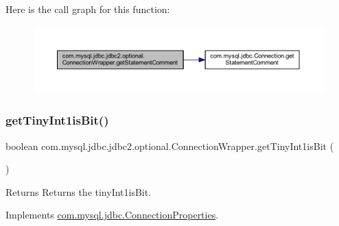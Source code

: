Here is the call graph for this function\+:
\nopagebreak
\begin{figure}[H]
\begin{center}
\leavevmode
\includegraphics[width=350pt]{classcom_1_1mysql_1_1jdbc_1_1jdbc2_1_1optional_1_1_connection_wrapper_a14a98d8f5aed8168fbb25a76210e9878_cgraph}
\end{center}
\end{figure}
\mbox{\label{classcom_1_1mysql_1_1jdbc_1_1jdbc2_1_1optional_1_1_connection_wrapper_a0c0c590343b7fce7d02e4293a92d4cb8}} 
\subsubsection{\texorpdfstring{get\+Tiny\+Int1is\+Bit()}{getTinyInt1isBit()}}
{\footnotesize\ttfamily boolean com.\+mysql.\+jdbc.\+jdbc2.\+optional.\+Connection\+Wrapper.\+get\+Tiny\+Int1is\+Bit (\begin{DoxyParamCaption}{ }\end{DoxyParamCaption})}

\begin{DoxyReturn}{Returns}
Returns the tiny\+Int1is\+Bit. 
\end{DoxyReturn}


Implements \mbox{\hyperlink{interfacecom_1_1mysql_1_1jdbc_1_1_connection_properties_a3bde53c87aba637f1e0833d504e96742}{com.\+mysql.\+jdbc.\+Connection\+Properties}}.

